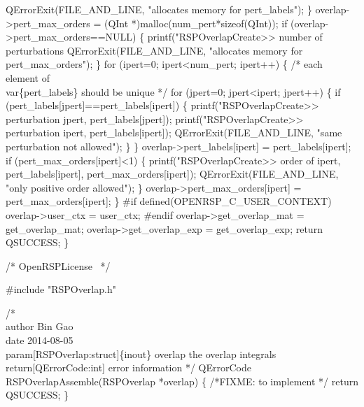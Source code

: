         QErrorExit(FILE_AND_LINE, "allocates memory for pert_labels");
    \}
    overlap->pert_max_orders = (QInt *)malloc(num_pert*sizeof(QInt));
    if (overlap->pert_max_orders==NULL) \{
        printf("RSPOverlapCreate>> number of perturbations %
        QErrorExit(FILE_AND_LINE, "allocates memory for pert_max_orders");
    \}
    for (ipert=0; ipert<num_pert; ipert++) \{
        /* each element of \\var\{pert_labels\} should be unique */
        for (jpert=0; jpert<ipert; jpert++) \{
            if (pert_labels[jpert]==pert_labels[ipert]) \{
                printf("RSPOverlapCreate>> perturbation %
                       jpert,
                       pert_labels[jpert]);
                printf("RSPOverlapCreate>> perturbation %
                       ipert,
                       pert_labels[ipert]);
                QErrorExit(FILE_AND_LINE, "same perturbation not allowed");
            \}
        \}
        overlap->pert_labels[ipert] = pert_labels[ipert];
        if (pert_max_orders[ipert]<1) \{
            printf("RSPOverlapCreate>> order of %
                   ipert,
                   pert_labels[ipert],
                   pert_max_orders[ipert]);
            QErrorExit(FILE_AND_LINE, "only positive order allowed");
        \}
        overlap->pert_max_orders[ipert] = pert_max_orders[ipert];
    \}
#if defined(OPENRSP_C_USER_CONTEXT)
    overlap->user_ctx = user_ctx;
#endif
    overlap->get_overlap_mat = get_overlap_mat;
    overlap->get_overlap_exp = get_overlap_exp;
    return QSUCCESS;
\}

\nwendcode{}\endmoddef
/*
  \LA{}OpenRSPLicense~{\nwtagstyle{}}\RA{}
*/

#include "RSPOverlap.h"

/*%
    \\author Bin Gao
    \\date 2014-08-05
    \\param[RSPOverlap:struct]\{inout\} overlap the overlap integrals
    \\return[QErrorCode:int] error information
*/
QErrorCode RSPOverlapAssemble(RSPOverlap *overlap)
\{
/*FIXME: to implement */
    return QSUCCESS;
\}

